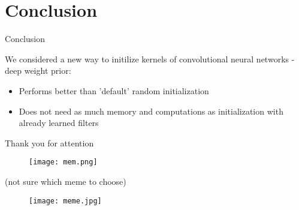 \documentclass[19pt]{beamer}
\begin{document}
\section{Conclusion}

\begin{frame}{Conclusion}

We considered a new way to initilize kernels of convolutional neural networks - deep weight prior:\\
\begin{itemize}
    \item Performs better than 'default' random initialization
    \item Does not need as much memory and computations as initialization with already learned filters
\end{itemize}

\end{frame}
 
\begin{frame}{Thank you for attention}
 
\begin{figure}
    \centering
    \texttt{[image: mem.png]}
    \label{fig:my_label}
\end{figure}

\end{frame}

\begin{frame}{(not sure which meme to choose)}
 
\begin{figure}
    \centering
    \texttt{[image: meme.jpg]}
    \label{fig:my_label}
\end{figure}

\end{frame}
\end{document}
